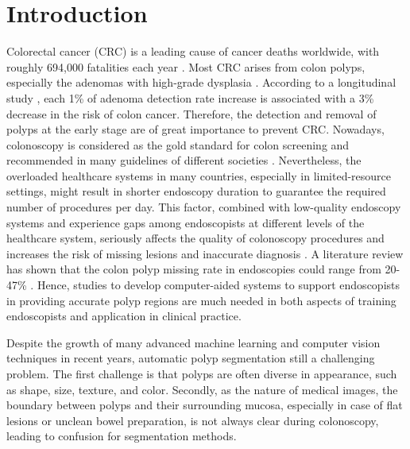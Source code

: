 \documentclass[review, sort&compress]{elsarticle}
\begin{document}
	\section{Introduction}
	
	Colorectal cancer (CRC) is a leading cause of cancer deaths worldwide, with roughly 694,000 fatalities each year \cite{bernal2017comparative}. Most CRC arises from colon polyps, especially the adenomas with high-grade dysplasia \cite{gschwantler2002high}. According to a longitudinal study \cite{corley2014adenoma}, each 1\% of adenoma detection rate increase is associated with a 3\% decrease in the risk of colon cancer. Therefore, the detection and removal of polyps at the early stage are of great importance to prevent CRC. Nowadays, colonoscopy is considered as the gold standard for colon screening and recommended in many guidelines of different societies \cite{issa2017colorectal}.
	Nevertheless, the overloaded healthcare systems in many countries, especially in limited-resource settings, might result in shorter endoscopy duration to guarantee the required number of procedures per day. This factor, combined with low-quality endoscopy systems and experience gaps among endoscopists at different levels of the healthcare system, seriously affects the quality of colonoscopy procedures and increases the risk of missing lesions and inaccurate diagnosis \cite{lee2008adequate, armin2015visibility}. A literature review has shown that the colon polyp missing rate in endoscopies could range from 20-47\% \cite{leufkens2012factors}. Hence, studies to develop computer-aided systems to support endoscopists in providing accurate polyp regions are much needed in both aspects of training endoscopists and application in clinical practice.
	
	Despite the growth of many advanced machine learning and computer vision techniques in recent years, automatic polyp segmentation still a challenging problem. The first challenge is that polyps are often diverse in appearance, such as shape, size, texture, and color. Secondly, as the nature of medical images, the boundary between polyps and their surrounding mucosa, especially in case of flat lesions or unclean bowel preparation, is not always clear during colonoscopy, leading to confusion for segmentation methods. 
	
\end{document}
